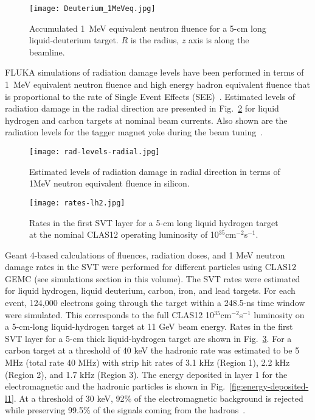 \begin{figure}[hbt] 
\centering 
\texttt{[image: Deuterium\_1MeVeq.jpg]}
\caption{Accumulated 1~MeV equivalent neutron fluence for a 5-cm long liquid-deuterium target. $R$ is the radius, $z$ axis is along the beamline.}
\label{fig:fluka2}
\end{figure}

FLUKA simulations of radiation damage levels have been performed in terms of 1~MeV equivalent neutron fluence and high energy hadron equivalent fluence that is proportional to the rate of Single Event Effects (SEE)~\cite{FLUKA3}. Estimated levels of radiation damage in the radial direction are presented in Fig.~\ref{fig:rad-levels-radial} for liquid hydrogen and carbon targets at nominal beam currents. Also shown are the radiation levels for the tagger magnet yoke during the beam tuning~\cite{BEAMLINENIM}.

\begin{figure}[hbt] 
\centering 
\texttt{[image: rad-levels-radial.jpg]}
\caption{Estimated levels of radiation damage in radial direction in terms of 1MeV neutron equivalent fluence in silicon.}
\label{fig:rad-levels-radial}
\end{figure}
 
\begin{figure}[hbt] 
\centering 
\texttt{[image: rates-lh2.jpg]}
\caption{Rates in the first SVT layer for a 5-cm long liquid hydrogen target at the nominal CLAS12 operating luminosity of 10$^{35}$cm$^{-2}$s$^{-1}$.}
\label{fig:rates-lh2}
\end{figure}

Geant 4-based calculations of fluences, radiation doses, and 1 MeV neutron damage rates in the SVT were performed for different particles using CLAS12 GEMC (see simulations section in this volume). The SVT rates were estimated for liquid hydrogen, liquid deuterium, carbon, iron, and lead targets. For each event, 124,000 electrons going through the target within a 248.5-ns time window were simulated. This corresponds to the full CLAS12 10$^{35}$cm$^{-2}$s$^{-1}$ luminosity on a 5-cm-long liquid-hydrogen target at 11 GeV beam energy. Rates in the first SVT layer for a 5-cm thick liquid-hydrogen target are shown in Fig.~\ref{fig:rates-lh2}. For a carbon target at a threshold of 40 keV the hadronic rate was estimated to be 5 MHz (total rate 40 MHz) with strip hit rates of 3.1 kHz (Region 1), 2.2 kHz (Region 2), and 1.7 kHz (Region 3). The energy deposited in layer 1 for the electromagnetic and the hadronic particles is shown in Fig.~\ref{fig:energy-deposited-l1}. At a threshold of 30 keV, 92$\%$ of the electromagnetic background is rejected while preserving  99.5$\%$ of the signals coming from the hadrons~\cite{TDRSVT}.

